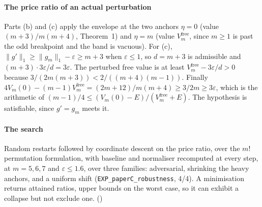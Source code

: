 \paragraph{The price ratio of an actual perturbation} Parts (b) and (c) apply the envelope
at the two anchors $\eta=0$ (value $(m+3)/m(m+4)$, Theorem~1) and $\eta=m$ (value
$V^{\mathrm{free}}_{m}$, since $m\ge1$ is past the odd breakpoint and the band is vacuous).
For (c), $\|g'\|_{1}\ge\|g_{m}\|_{1}-\varepsilon\ge m+3$ when $\varepsilon\le1$, so $d=m+3$ is
admissible and $(m+3)\cdot3\varepsilon/d=3\varepsilon$. The perturbed free value is at least
$V^{\mathrm{free}}_{m}-3\varepsilon/d>0$ because
$3/(2m(m+3))<2/((m+4)(m-1))$. Finally
$4V_{m}(0)-(m-1)V^{\mathrm{free}}_{m}=(2m+12)/m(m+4)\ge3/2m\ge3\varepsilon$, which is the
arithmetic of $(m-1)/4\le(V_{m}(0)-E)/(V^{\mathrm{free}}_{m}+E)$. The hypothesis is
satisfiable, since $g'=g_{m}$ meets it.



\paragraph{The search} Random restarts followed by coordinate descent on the price ratio,
over the $m!$ permutation formulation, with baseline and normaliser recomputed at every
step, at $m=5,6,7$ and $\varepsilon\le1.6$, over three families: adversarial, shrinking the
heavy anchors, and a uniform shift (\texttt{EXP\_paperC\_robustness}, 4/4). A minimisation
returns attained ratios, upper bounds on the worst case, so it can exhibit a collapse but
not exclude one. (\NUM)

